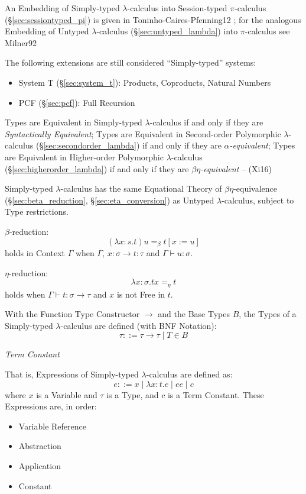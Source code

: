 \fist An Embedding of Simply-typed $\lambda$-calculus into
Session-typed $\pi$-calculus (\S\ref{sec:sessiontyped_pi}) is given in
Toninho-Caires-Pfenning12 \cite{caires-pfenning-toninho12}; for the
analogous Embedding of Untyped $\lambda$-calculus
(\S\ref{sec:untyped_lambda}) into $\pi$-calculus see Milner92
\cite{milner92}

The following extensions are still considered ``Simply-typed''
systems:
\begin{itemize}
  \item System T (\S\ref{sec:system_t}): Products, Coproducts, Natural
    Numbers
  \item PCF (\S\ref{sec:pcf}): Full Recursion
\end{itemize}

Types are Equivalent in Simply-typed $\lambda$-calculus if and only if
they are \emph{Syntactically Equivalent}; Types are Equivalent in
Second-order Polymorphic $\lambda$-calculus
(\S\ref{sec:secondorder_lambda}) if and only if they are
\emph{$\alpha$-equivalent}; Types are Equivalent in Higher-order
Polymorphic $\lambda$-calculus (\S\ref{sec:higherorder_lambda}) if and
only if they are \emph{$\beta\eta$-equivalent} -- (Xi16)

Simply-typed $\lambda$-calculus has the same Equational Theory of
$\beta\eta$-equivalence (\S\ref{sec:beta_reduction},
\S\ref{sec:eta_conversion}) as Untyped $\lambda$-calculus, subject to
Type restrictions.

$\beta$-reduction:
\[
  (\lambda x:s.t)u =_\beta t[x := u]
\]
holds in Context $\Gamma$ when $\Gamma$, $x:\sigma \rightarrow t:\tau$
and $\Gamma \vdash u:\sigma$.

$\eta$-reduction:
\[
  \lambda x:\sigma .t x =_\eta t
\]
holds when $\Gamma \vdash t : \sigma \rightarrow \tau$ and $x$ is not
Free in $t$.

With the Function Type Constructor $\rightarrow$ and the Base Types
$B$, the Types of a Simply-typed $\lambda$-calculus are defined (with
BNF Notation):
\[
  \tau ::= \tau \rightarrow \tau \;|\; T \in B
\]

\emph{Term Constant}

That is, Expressions of Simply-typed $\lambda$-calculus are defined
as:
\[
  e ::= x \;|\; \lambda x:t.e \;|\; e e \;|\; c
\]
where $x$ is a Variable and $\tau$ is a Type, and $c$ is a Term
Constant. These Expressions are, in order:
\begin{itemize}
  \item Variable Reference
  \item Abstraction
  \item Application
  \item Constant
\end{itemize}

